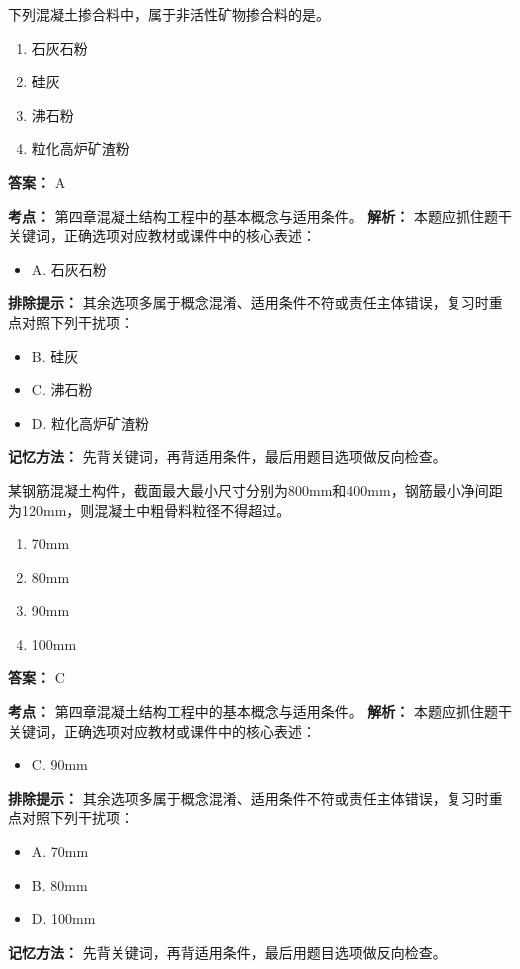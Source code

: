 \documentclass[UTF8,fontset=fandol,11pt]{ctexart}
\begin{document}
\vspace{0.2em}

\begin{quizbox}[title={第 58 题}]
下列混凝土掺合料中，属于非活性矿物掺合料的是。\\
\begin{enumerate}[label=\Alph*.]
\item 石灰石粉
\item 硅灰
\item 沸石粉
\item 粒化高炉矿渣粉
\end{enumerate}
\textbf{答案：} A
\vspace{0.25em}
\begin{answerbox}[title={考点解析}]
\textbf{考点：} 第四章混凝土结构工程中的基本概念与适用条件。
\textbf{解析：} 本题应抓住题干关键词，正确选项对应教材或课件中的核心表述：
\begin{itemize}
\item A. 石灰石粉
\end{itemize}
\textbf{排除提示：} 其余选项多属于概念混淆、适用条件不符或责任主体错误，复习时重点对照下列干扰项：
\begin{itemize}
\item B. 硅灰
\item C. 沸石粉
\item D. 粒化高炉矿渣粉
\end{itemize}
\textbf{记忆方法：} 先背关键词，再背适用条件，最后用题目选项做反向检查。
\end{answerbox}
\end{quizbox}

\vspace{0.2em}

\begin{quizbox}[title={第 59 题}]
某钢筋混凝土构件，截面最大最小尺寸分别为800mm和400mm，钢筋最小净间距为120mm，则混凝土中粗骨料粒径不得超过。\\
\begin{enumerate}[label=\Alph*.]
\item 70mm
\item 80mm
\item 90mm
\item 100mm
\end{enumerate}
\textbf{答案：} C
\vspace{0.25em}
\begin{answerbox}[title={考点解析}]
\textbf{考点：} 第四章混凝土结构工程中的基本概念与适用条件。
\textbf{解析：} 本题应抓住题干关键词，正确选项对应教材或课件中的核心表述：
\begin{itemize}
\item C. 90mm
\end{itemize}
\textbf{排除提示：} 其余选项多属于概念混淆、适用条件不符或责任主体错误，复习时重点对照下列干扰项：
\begin{itemize}
\item A. 70mm
\item B. 80mm
\item D. 100mm
\end{itemize}
\textbf{记忆方法：} 先背关键词，再背适用条件，最后用题目选项做反向检查。
\end{answerbox}
\end{quizbox}
\end{document}
